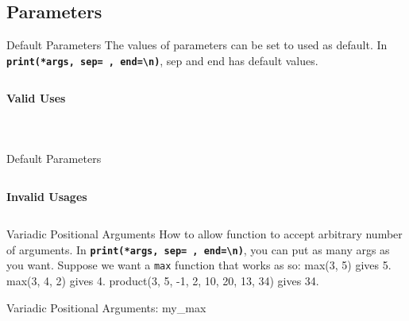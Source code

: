       \subsection{Parameters}    

        \begin{frame}{Default Parameters}
            The values of parameters can be set to used as default.
            \newline
            In \textbf{\texttt{print(*args, sep=\textquotesingle \ \textquotesingle, end=\textquotesingle \textbackslash n\textquotesingle )}}, 
            sep and end has default values.
            \pause
            \inputminted[frame=single,framesep=2pt, lastline=15]{python3}{code-examples/default.py}
            \textbf{Valid Uses}
            \begin{columns}
                \begin{column}{0.50\textwidth}
                    \pause
                    \inputminted[frame=single,framesep=2pt, lastline=15]{python3}{code-examples/valid1.py}  
                \end{column}
                \begin{column}{0.50\textwidth}
                    \pause
                    \inputminted[frame=single,framesep=2pt, lastline=15]{python3}{code-examples/valid1_1.py}                    
                \end{column}
            \end{columns}
        \end{frame}

        \begin{frame}{Default Parameters}
            \inputminted[frame=single,framesep=2pt, lastline=15]{python3}{code-examples/default.py}
            \pause
            \LARGE
            \textbf{Invalid Usages}
            \inputminted[frame=single,framesep=2pt, lastline=15]{python3}{code-examples/valid2.py}  
        \end{frame}

        \begin{frame}{Variadic Positional Arguments}
            \pause
            \LARGE
            How to allow function to accept arbitrary number of arguments.
            \newline
            In \textbf{\texttt{print(*args, sep=\textquotesingle \ \textquotesingle, end=\textquotesingle \textbackslash n\textquotesingle )}}, 
            you can put as many args as you want.
            \pause
            \newline 
            \newline Suppose we want a \texttt{max} function that works as so:
            \newline max(3, 5) gives 5.
            \newline max(3, 4, 2) gives 4.
            \newline product(3, 5, -1, 2, 10, 20, 13, 34) gives 34.
            \newline 
        \end{frame}

        \begin{frame}{Variadic Positional Arguments: my\_max}
          \pause
          \large
          \inputminted[frame=single,framesep=2pt]{python3}{code-examples/variadic.py}
        \end{frame}
